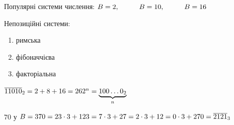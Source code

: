 \documentclass[a4paper,12pt, centered]{bookest}
\newcommand\tab[1][1cm]{\hspace*{#1}}
\begin{document}
Популярні системи числення: 
$B=2,\tab B=10,\tab B=16\\$

Непозиційні системи:\begin{enumerate}
	\item римська 
	\item фібоначчієва
	\item факторіальна
\end{enumerate}

\begin{example}
	$\overline{11010}_2=2+8+16=26\\ 2^n=\underbrace{100\dots0_2}_{n}$
\end{example}
\begin{example}
	$70$ у $B=3\\70=23\cdot 3+1\\23=7\cdot 3+2\\7=2\cdot 3+1\\2=0\cdot3+2\\70=\overline{2121}_3$
\end{example}
\end{document}
